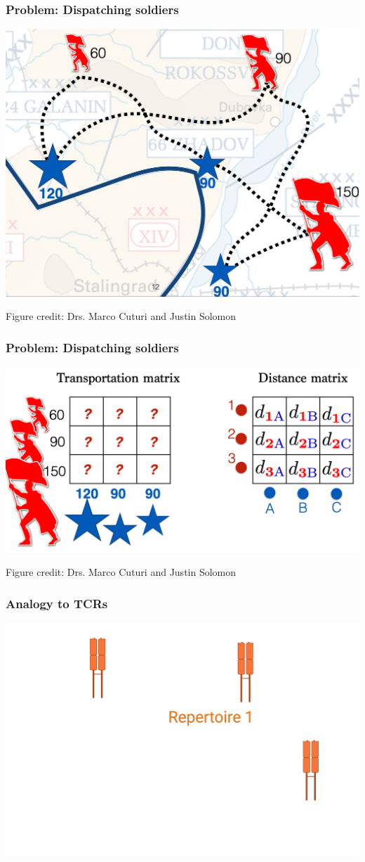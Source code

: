 \documentclass[mathserif,compress,xcolor={dvipsnames}]{beamer}
\renewcommand\;{\,}
\begin{document}
\begin{frame}\frametitle{Problem: Dispatching soldiers}
\begin{center}
\includegraphics[width=0.8\linewidth]{Images/soldiers.png}
\end{center}
{\scriptsize * Figure credit: Drs. Marco Cuturi and Justin Solomon}
\end{frame}

\begin{frame}\frametitle{Problem: Dispatching soldiers}
\begin{center}
\includegraphics[width=0.8\linewidth]{Images/soldiers_as_OT.png}
\end{center}
{\scriptsize * Figure credit: Drs. Marco Cuturi and Justin Solomon}
\end{frame}

\begin{frame}\frametitle{Analogy to TCRs}
\begin{center}
\includegraphics[width=\linewidth]{Images/TCR_soldier_rep_1.png}
\end{center}
\end{frame}
\end{document}
